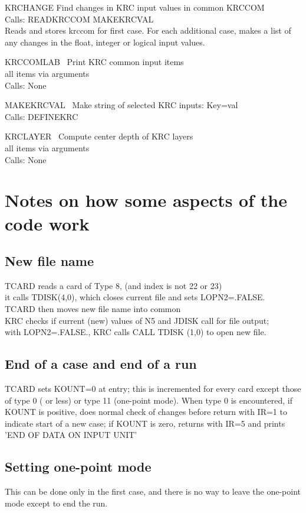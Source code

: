 \documentclass{article}
\newcommand{\qi}{\\ \hspace*{2.em}}      %
\newcommand{\qii}{\\ \hspace*{4.em}}     %
\begin{document}
KRCHANGE   Find changes in KRC input values in common KRCCOM \\
Calls:  READKRCCOM  MAKEKRCVAL \\
Reads and stores krccom for first case. For each additional case, makes a 
list of any changes in the float, integer or logical input values. 

KRCCOMLAB \ Print KRC common input items \\
 all items via arguments \\
Calls: None

MAKEKRCVAL \ Make string of selected KRC inputs: Key=val \\
Calls: DEFINEKRC

KRCLAYER \ Compute center depth of KRC layers \\
 all items via arguments \\
Calls: None


\section{Notes on how some aspects of the code work} %

\subsection{New file name}%
TCARD reads a card of Type 8, (and index is not 22 or 23)
\qi it calls  TDISK(4,0), which closes current file and sets  LOPN2=.FALSE.
\qii   TCARD then moves new file name into common \\
KRC checks if current (new) values of N5 and JDISK call for file output;
\qi  with  LOPN2=.FALSE., KRC calls CALL TDISK (1,0) to open new file.

\subsection{End of a case and end of a run}%
TCARD sets KOUNT=0 at entry; this is incremented for every card except those of
type 0 ( or less) or type 11 (one-point mode). When type 0 is encountered, if
KOUNT is positive, does normal check of changes before return with IR=1 to
indicate start of a new case; if KOUNT is zero, returns with IR=5 and prints
'END OF DATA ON INPUT UNIT'

\subsection{Setting one-point mode}%
This can be done only in the first case, and there is no way to leave the 
one-point mode except to end the run.
\end{document}
